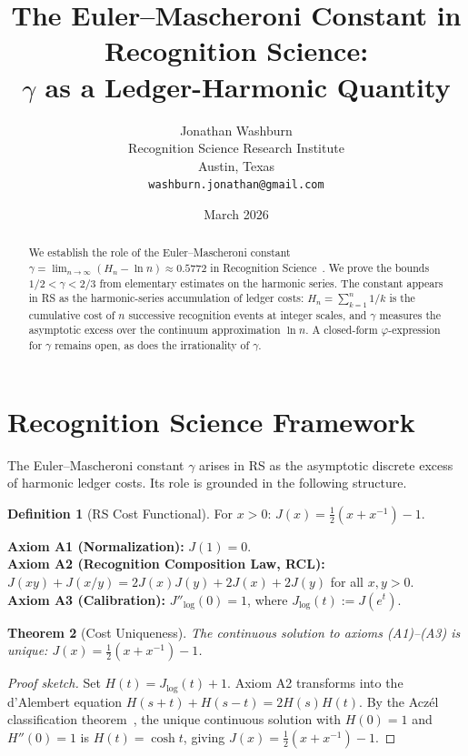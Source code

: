\documentclass[12pt,a4paper]{article}
\title{The Euler--Mascheroni Constant in Recognition Science:\\
$\gamma$ as a Ledger-Harmonic Quantity}
\author{Jonathan Washburn\\
Recognition Science Research Institute\\
Austin, Texas\\
\texttt{washburn.jonathan@gmail.com}}
\date{March 2026}
\newtheorem{theorem}{Theorem}[section]
\theoremstyle{definition}
\newtheorem{definition}[theorem]{Definition}
\theoremstyle{remark}
\begin{document}
\maketitle

\begin{abstract}
We establish the role of the Euler--Mascheroni constant
$\gamma = \lim_{n\to\infty}(H_n - \ln n) \approx 0.5772$ in
Recognition Science~\cite{RS_Axioms}.  We prove the bounds
$1/2 < \gamma < 2/3$ from elementary estimates on the harmonic
series.  The constant appears in RS as the harmonic-series accumulation
of ledger costs: $H_n = \sum_{k=1}^n 1/k$ is the cumulative cost of
$n$ successive recognition events at integer scales, and $\gamma$
measures the asymptotic excess over the continuum approximation
$\ln n$.  A closed-form $\varphi$-expression for $\gamma$ remains
open, as does the irrationality of $\gamma$.
\end{abstract}

\section{Recognition Science Framework}
\label{sec:framework}

The Euler--Mascheroni constant $\gamma$ arises in RS as the
asymptotic discrete excess of harmonic ledger costs.
Its role is grounded in the following structure.

\begin{definition}[RS Cost Functional]
For $x > 0$: $J(x) = \tfrac{1}{2}(x + x^{-1}) - 1$.
\end{definition}

\noindent\textbf{Axiom A1 (Normalization):} $J(1) = 0$.\\
\textbf{Axiom A2 (Recognition Composition Law, RCL):}
$J(xy)+J(x/y)=2J(x)J(y)+2J(x)+2J(y)$ for all $x,y>0$.\\
\textbf{Axiom A3 (Calibration):} $J''_{\log}(0) = 1$, where
$J_{\log}(t) := J(e^t)$.

\begin{theorem}[Cost Uniqueness]
\label{thm:unique}
The continuous solution to axioms \textup{(A1)--(A3)} is
unique: $J(x) = \tfrac{1}{2}(x + x^{-1}) - 1$.
\end{theorem}

\begin{proof}[Proof sketch]
Set $H(t) = J_{\log}(t)+1$.  Axiom A2 transforms into the d'Alembert
equation $H(s+t)+H(s-t)=2H(s)H(t)$.  By the Acz\'el classification
theorem~\cite{Aczel1966}, the unique continuous solution with $H(0)=1$
and $H''(0)=1$ is $H(t)=\cosh t$, giving
$J(x)=\tfrac{1}{2}(x+x^{-1})-1$.
\end{proof}
\end{document}

